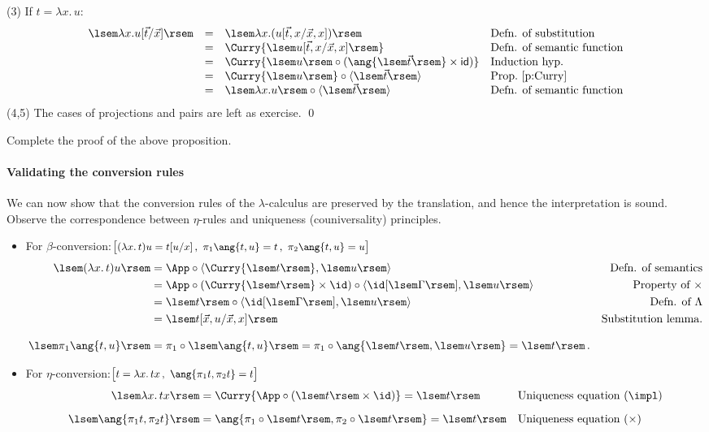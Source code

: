 \documentclass[12pt]{article}
\begin{document}
%
(3) If $t = \lambda x.\,u$:
\[ \begin{array}{rcl@{\quad}l}
\lsem \lambda x.u [\vec{t}/\vec{x}] \rsem & = & \lsem \lambda x. (u[\vec{t},x/\vec{x},x]) \rsem &  \text{Defn. of substitution} \\
& = & \Curry{\lsem u[\vec{t},x/\vec{x},x]  \rsem} & \text{Defn. of semantic function} \\
& = &  \Curry{\lsem u \rsem \circ (\ang{\lsem\vec{t}\rsem}\times \mathsf{id})} &  \text{Induction hyp.} \\
& = & \Curry{\lsem u \rsem} \circ  \langle \lsem \vec{t} \rsem \rangle & \text{Prop.~\ref{p:Curry}} \\
& = & \lsem \lambda x.u \rsem \circ  \langle \lsem \vec{t} \rsem \rangle & \text{Defn. of semantic function}
\end{array}
\]
(4,5) The cases of projections and pairs are left as exercise. \qed

\begin{myexercise}
Complete the proof of the above proposition.
\end{myexercise}


\paragraph{Validating the conversion rules}
We can now show that the conversion rules of the $\lambda$-calculus are {preserved} by the translation, and hence the interpretation is
{sound}. Observe the correspondence between $\eta$-rules and uniqueness (couniversality) principles.
\begin{itemize}
    \item For $\beta$-conversion:\qd $\big[\text{\small$(\lambda x. \, t)u = t[u/x]\,,\ \pi_1\ang{t,u}=t\,,\ \pi_2\ang{t,u}=u$}\big]$
\begin{align*}
\lsem (\lambda x.\,t)u \rsem &=  \App \circ \langle \Curry{\lsem t \rsem}, \lsem u \rsem \rangle & \text{Defn. of semantics}& \\
& =  \App \circ (\Curry{\lsem t \rsem} \times \id) \circ \langle \id[\lsem \Gamma \rsem], \lsem u \rsem \rangle & \text{Property of $\times$}& \\
& = \lsem t \rsem \circ \langle \id[\lsem \Gamma \rsem], \lsem u \rsem \rangle & \text{Defn. of }\Lambda& \\
& = \lsem t[\vec{x},u/\vec{x},x] \rsem & \text{Substitution lemma}.&
\\[3mm]
\lsem \pi_1\ang{t,u} \rsem &= \pi_1\circ \lsem\ang{t,u}\rsem = \pi_1\circ \ang{\lsem t\rsem,\lsem u\rsem} = \lsem t \rsem\,.
\end{align*}
\item For
$\eta$-conversion:\qd $\big[\text{\small$t = \lambda x.\,tx \,,\ \ang{\pi_1t,\pi_2t}=t$}\big]$
\begin{align*}
    \lsem  \lambda x.\,tx \rsem &= \Curry{\App \circ (\lsem t \rsem \times \id)} = \lsem t \rsem & \text{Uniqueness equation }&(\impl)\\[2mm]
    \lsem \ang{\pi_1t,\pi_2t} \rsem &= \ang{\pi_1\circ\lsem t\rsem, \pi_2\circ\lsem t\rsem} = \lsem t \rsem & \text{Uniqueness equation }&(\times)
\end{align*}
\end{itemize}
\end{document}
